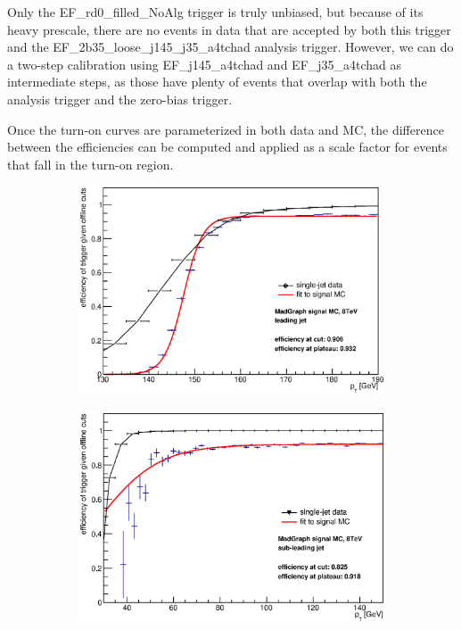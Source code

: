 Only the EF\_rd0\_filled\_NoAlg trigger is truly unbiased, but because of its heavy prescale,
there are no events in data that are accepted by both this trigger and the EF\_2b35\_loose\_j145\_j35\_a4tchad
analysis trigger.  However, we can do a two-step calibration using EF\_j145\_a4tchad and
EF\_j35\_a4tchad as intermediate steps, as those have plenty of events that overlap 
with both the analysis trigger and the zero-bias trigger.

Once the turn-on curves are parameterized in both data and MC, the difference between the efficiencies
can be computed and applied as a scale factor for events that fall in the turn-on region.  


\begin{figure}[phtb!]
  \begin{center}
  \begin{subfigure}[leading jet, $m_{A}=400$ GeV]{0.45\textwidth}\includegraphics[width=\textwidth]{Systematics/images/jet0_trigger_turn_on_all_j35.eps}\end{subfigure}
  \begin{subfigure}[sub-leading jet, $m_{A}=400$ GeV]{0.45\textwidth}\includegraphics[width=\textwidth]{Systematics/images/jet1_trigger_turn_on_all_j35.eps}\end{subfigure}

\end{center}
\end{figure}
